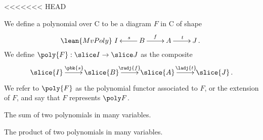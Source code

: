 <<<<<<< HEAD
\begin{def}
  We define a polynomial over C to be a diagram $F$ in C of shape
  \begin{equation}
  \lean{MvPoly}
  \label{equ:poly}
  \xymatrix{
  I  & B \ar[l]_s \ar[r]^f & A \ar[r]^t & J \, . }
  \end{equation}
  We define $\poly{F}:\slice I \to \slice J$ as the composite
  \[
  \xymatrix{
  \slice{I} \ar[r]^{\pbk{s}} & \slice{B} \ar[r]^{\radj{f}} & \slice{A} \ar[r]^{\ladj{t}} & \slice{J} \, . }
  \]
  We refer to $\poly{F}$ as the polynomial functor associated to $F$, or
  the extension of $F$, and say that $F$ represents $\poly F$.
\end{def}

\begin{def}
The sum of two polynomials in many variables.
\end{def}

\begin{def}
The product of two polynomials in many variables.
\end{def}

